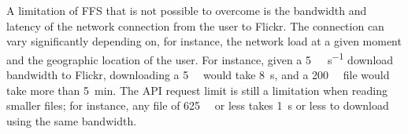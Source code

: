 A limitation of \gls{FFS} that is not possible to overcome is the bandwidth and latency of the network connection from the user to Flickr. The connection can vary significantly depending on, for instance, the network load at a given moment and the geographic location of the user. For instance, given a \SI[per-mode = symbol]{5}{\mega\bit\per\second} download bandwidth to Flickr, downloading a \SI[per-mode = symbol]{5}{\mega\byte} would take \SI[per-mode = symbol]{8}{\second}, and a \SI[per-mode = symbol]{200}{\mega\byte} file would take more than \SI[per-mode = symbol]{5}{\minute}. The \gls{API} request limit is still a limitation when reading smaller files; for instance, any file of \SI[per-mode = symbol]{625}{\kilo\byte} or less takes \SI[per-mode = symbol]{1}{\second} or less to download using the same bandwidth. 